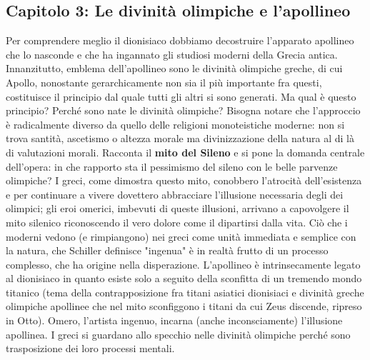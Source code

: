 \documentclass[10pt,a4paper]{article}
\begin{document}
\subsection{Capitolo 3: Le divinità olimpiche e l'apollineo}
Per comprendere meglio il dionisiaco dobbiamo decostruire l'apparato apollineo che lo nasconde e che ha ingannato gli studiosi moderni della Grecia antica. Innanzitutto, emblema dell'apollineo sono le divinità olimpiche greche, di cui Apollo, nonostante gerarchicamente non sia il più importante fra questi, costituisce il principio dal quale tutti gli altri si sono generati. Ma qual è questo principio? Perché sono nate le divinità olimpiche? Bisogna notare che l'approccio è radicalmente diverso da quello delle religioni monoteistiche moderne: non si trova santità, ascetismo o altezza morale ma divinizzazione della natura al di là di valutazioni morali. Racconta il \textbf{mito del Sileno} e si pone la domanda centrale dell'opera: in che rapporto sta il pessimismo del sileno con le belle parvenze olimpiche? I greci, come dimostra questo mito, conobbero l'atrocità dell'esistenza e per continuare a vivere dovettero abbracciare l'illusione necessaria degli dei olimpici; gli eroi omerici, imbevuti di queste illusioni, arrivano a capovolgere il mito silenico riconoscendo il vero dolore come il dipartirsi dalla vita. Ciò che i moderni vedono (e rimpiangono) nei greci come unità immediata e semplice con la natura, che Schiller definisce "ingenua" è in realtà frutto di un processo complesso, che ha origine nella disperazione. L'apollineo è intrinsecamente legato al dionisiaco in quanto esiste solo a seguito della sconfitta di un tremendo mondo titanico (tema della contrapposizione fra titani asiatici dionisiaci e divinità greche olimpiche apollinee che nel mito sconfiggono i titani da cui Zeus discende, ripreso in Otto). Omero, l'artista ingenuo, incarna (anche inconsciamente) l'illusione apollinea. I greci si guardano allo specchio nelle divinità olimpiche perché sono trasposizione dei loro processi mentali.     
\end{document}

